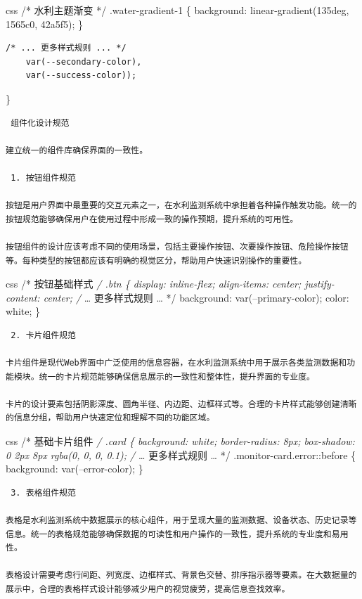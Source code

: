 css /* 水利主题渐变 */ .water-gradient-1 \{ background: linear-gradient(135deg, 1565c0, 42a5f5); \}

\begin{verbatim}
/* ... 更多样式规则 ... */
    var(--secondary-color),
    var(--success-color));
\end{verbatim}

\}

\begin{lstlisting}
 组件化设计规范

建立统一的组件库确保界面的一致性。

 1. 按钮组件规范

按钮是用户界面中最重要的交互元素之一，在水利监测系统中承担着各种操作触发功能。统一的按钮规范能够确保用户在使用过程中形成一致的操作预期，提升系统的可用性。

按钮组件的设计应该考虑不同的使用场景，包括主要操作按钮、次要操作按钮、危险操作按钮等。每种类型的按钮都应该有明确的视觉区分，帮助用户快速识别操作的重要性。
\end{lstlisting}

css /* 按钮基础样式 \emph{/ .btn \{ display: inline-flex; align-items: center; justify-content: center; /} \ldots{} 更多样式规则 \ldots{} */ background: var(--primary-color); color: white; \}

\begin{lstlisting}
 2. 卡片组件规范

卡片组件是现代Web界面中广泛使用的信息容器，在水利监测系统中用于展示各类监测数据和功能模块。统一的卡片规范能够确保信息展示的一致性和整体性，提升界面的专业度。

卡片的设计要素包括阴影深度、圆角半径、内边距、边框样式等。合理的卡片样式能够创建清晰的信息分组，帮助用户快速定位和理解不同的功能区域。
\end{lstlisting}

css /* 基础卡片组件 \emph{/ .card \{ background: white; border-radius: 8px; box-shadow: 0 2px 8px rgba(0, 0, 0, 0.1); /} \ldots{} 更多样式规则 \ldots{} */ .monitor-card.error::before \{ background: var(--error-color); \}

\begin{lstlisting}
 3. 表格组件规范

表格是水利监测系统中数据展示的核心组件，用于呈现大量的监测数据、设备状态、历史记录等信息。统一的表格规范能够确保数据的可读性和用户操作的一致性，提升系统的专业度和易用性。

表格设计需要考虑行间距、列宽度、边框样式、背景色交替、排序指示器等要素。在大数据量的展示中，合理的表格样式设计能够减少用户的视觉疲劳，提高信息查找效率。
\end{lstlisting}

